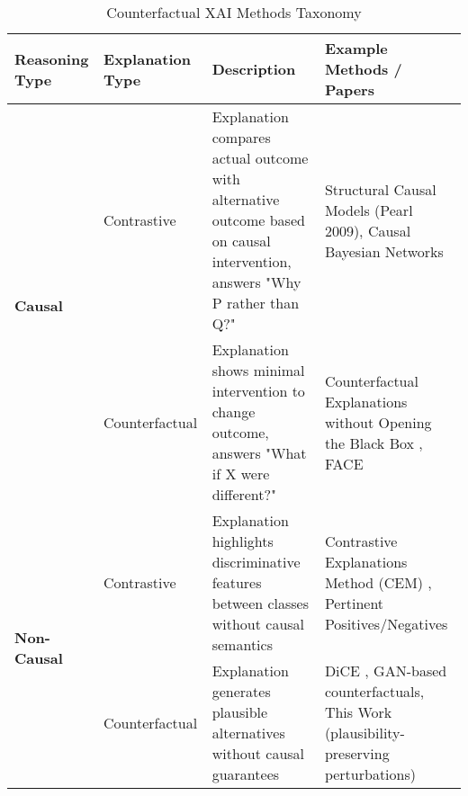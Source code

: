 
\begin{table}[htbp]
\centering
\caption{Counterfactual XAI Methods Taxonomy}
\label{tab:counterfactual_taxonomy}
\small
\begin{tabularx}{\textwidth}{llXp{}}
\toprule
\textbf{Reasoning Type} & \textbf{Explanation Type} & \textbf{Description} & \textbf{Example Methods / Papers} \\
\midrule
\multirow{2}{*}{\textbf{Causal}} & Contrastive & Explanation compares actual outcome with alternative outcome based on causal intervention, answers "Why P rather than Q?" & Structural Causal Models (Pearl 2009), Causal Bayesian Networks \cite{pearl2009causality} \\[6pt]
\cmidrule(lr){2-4}
& Counterfactual & Explanation shows minimal intervention to change outcome, answers "What if X were different?" & Counterfactual Explanations without Opening the Black Box \cite{wachter2017counterfactual}, FACE \cite{poyiadzi2020face} \\[10pt]

\midrule

\multirow{2}{*}{\textbf{Non-Causal}} & Contrastive & Explanation highlights discriminative features between classes without causal semantics & Contrastive Explanations Method (CEM) \cite{dhurandhar2018cem}, Pertinent Positives/Negatives \\[6pt]
\cmidrule(lr){2-4}
& Counterfactual & Explanation generates plausible alternatives without causal guarantees & DiCE \cite{mothilal2020dice}, GAN-based counterfactuals, This Work (plausibility-preserving perturbations) \\

\bottomrule
\end{tabularx}
\end{table}

